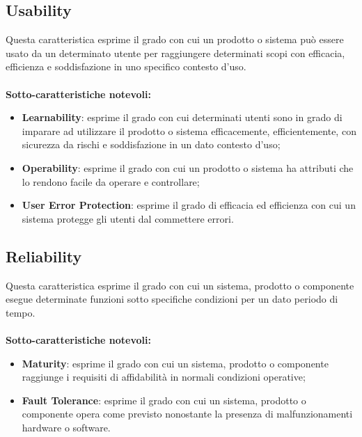 \subsection{Usability}
Questa caratteristica esprime il grado con cui un prodotto o sistema può essere usato da un determinato utente per raggiungere determinati scopi con efficacia, efficienza e soddisfazione in uno specifico contesto d'uso.\\ \\
\textbf{Sotto-caratteristiche notevoli:}
\begin{itemize}
	\item{\textbf{Learnability}}: esprime il grado con cui determinati utenti sono in grado di imparare ad utilizzare il prodotto o sistema efficacemente, efficientemente, con sicurezza da rischi e soddisfazione in un dato contesto d'uso;
	\item{\textbf{Operability}}: esprime il grado con cui un prodotto o sistema ha attributi che lo rendono facile da operare e controllare;
	\item{\textbf{User Error Protection}}: esprime il grado di efficacia ed efficienza con cui un sistema protegge gli utenti dal commettere errori.
\end{itemize}

\subsection{Reliability}
Questa caratteristica esprime il grado con cui un sistema, prodotto o componente esegue determinate funzioni sotto specifiche condizioni per un dato periodo di tempo. \\ \\
\textbf{Sotto-caratteristiche notevoli:}
\begin{itemize}
	\item{\textbf{Maturity}}: esprime il grado con cui un sistema, prodotto o componente raggiunge i requisiti di affidabilità in normali condizioni operative;
	\item{\textbf{Fault Tolerance}}: esprime il grado con cui un sistema, prodotto o componente opera come previsto nonostante la presenza di malfunzionamenti hardware o software.
\end{itemize}

